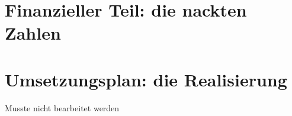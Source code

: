 \section{Finanzieller Teil: die nackten Zahlen}

\section{Umsetzungsplan: die Realisierung}
Musste nicht bearbeitet werden

